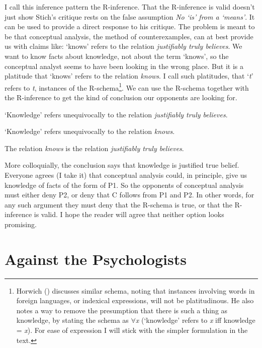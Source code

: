 \documentclass[
  11pt,
  letterpaper,
  DIV=11,
  numbers=noendperiod,
  twoside]{scrartcl}
\providecommand{\tightlist}{%
  \setlength{\itemsep}{0pt}\setlength{\parskip}{0pt}}\usepackage{longtable,booktabs,array}
\begin{document}
I call this inference pattern the R-inference. That the R-inference is
valid doesn't just show Stich's critique rests on the false assumption
\emph{No `is' from a `means'}. It can be used to provide a direct
response to his critique. The problem is meant to be that conceptual
analysis, the method of counterexamples, can at best provide us with
claims like: `knows' refers to the relation \emph{justifiably truly
believes}. We want to know facts about knowledge, not about the term
`knows', so the conceptual analyst seems to have been looking in the
wrong place. But it is a platitude that `knows' refers to the relation
\emph{knows}. I call such platitudes, that `\emph{t}' refers to
\emph{t}, instances of the R-schema\footnote{Horwich
  () discusses similar schema,
  noting that instances involving words in foreign languages, or
  indexical expressions, will not be platitudinous. He also notes a way
  to remove the presumption that there is such a thing as knowledge, by
  stating the schema as \({\forall}\)\emph{x} (`knowledge' refers to
  \emph{x} iff knowledge = \emph{x}). For ease of expression I will
  stick with the simpler formulation in the text.}. We can use the
R-schema together with the R-inference to get the kind of conclusion our
opponents are looking for.

\begin{description}
\tightlist
\item[P1.]
`Knowledge' refers unequivocally to the relation \emph{justifiably truly
believes}.
\item[P2.]
`Knowledge' refers unequivocally to the relation \emph{knows}.
\item[C.]
The relation \emph{knows} is the relation \emph{justifiably truly
believes}.
\end{description}

More colloquially, the conclusion says that knowledge is justified true
belief. Everyone agrees (I take it) that conceptual analysis could, in
principle, give us knowledge of facts of the form of P1. So the
opponents of conceptual analysis must either deny P2, or deny that C
follows from P1 and P2. In other words, for any such argument they must
deny that the R-schema is true, or that the R-inference is valid. I hope
the reader will agree that neither option looks promising.

\section{Against the Psychologists}\label{against-the-psychologists}
\end{document}
